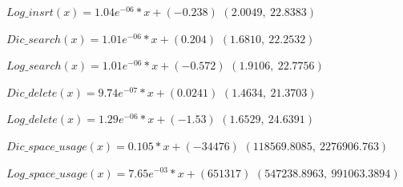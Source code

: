 \documentclass[a4paper,12pt, openany]{book}
\begin{document}
		\vspace{.5cm}
$		Log\_insrt(x) = 1.04e^{-06}*x + (-0.238)$\hspace{1.17in} $(2.0049, \ 22.8383)$

\vspace{.5cm}
$		Dic\_search(x) = 1.01e^{-06}*x + (0.204) $ \hspace{1.15in} $(1.6810, \  22.2532)$  
\vspace{.5cm}

$	    Log\_search(x)  = 1.01e^{-06}*x +  (-0.572)$ \hspace{1.01in}  $(1.9106, \ 22.7756)$
\vspace{.5cm}

$		Dic\_delete(x)  = 9.74e^{-07}*x + (0.0241)$ \hspace{1.15in} $(1.4634,  \ 21.3703)$

\vspace{.5cm}
$		Log\_delete(x) =  1.29e^{-06}*x + (-1.53)$ \hspace{1.17in}  $(1.6529,\  24.6391)$ 
\vspace{.5cm}

$		Dic\_space\_usage(x) = 0.105*x + (-34476)$ \hspace{.84in}  $(118569.8085, \ 
2276906.763)$
\vspace{.5cm}

$	    Log\_space\_usage(x) = 7.65e^{-03}*x + (651317)$ \hspace{.67in}  $(	547238.8963 , \ 991063.3894)$
\end{document}

